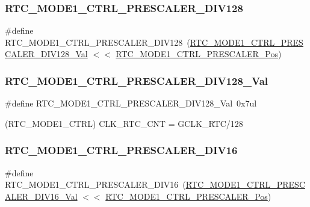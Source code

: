 \subsubsection{\texorpdfstring{RTC\_MODE1\_CTRL\_PRESCALER\_DIV128}{RTC\_MODE1\_CTRL\_PRESCALER\_DIV128}}
{\footnotesize\ttfamily \#define R\+T\+C\+\_\+\+M\+O\+D\+E1\+\_\+\+C\+T\+R\+L\+\_\+\+P\+R\+E\+S\+C\+A\+L\+E\+R\+\_\+\+D\+I\+V128~(\mbox{\hyperlink{group___s_a_m_d21___r_t_c_gaba4ba3df4dc79b5eba5ec7d8dab4ae5e}{R\+T\+C\+\_\+\+M\+O\+D\+E1\+\_\+\+C\+T\+R\+L\+\_\+\+P\+R\+E\+S\+C\+A\+L\+E\+R\+\_\+\+D\+I\+V128\+\_\+\+Val}} $<$$<$ \mbox{\hyperlink{group___s_a_m_d21___r_t_c_gad44b853d16e29aa5a84f3bb4087a6e1e}{R\+T\+C\+\_\+\+M\+O\+D\+E1\+\_\+\+C\+T\+R\+L\+\_\+\+P\+R\+E\+S\+C\+A\+L\+E\+R\+\_\+\+Pos}})}

\mbox{\label{group___s_a_m_d21___r_t_c_gaba4ba3df4dc79b5eba5ec7d8dab4ae5e}} 
\subsubsection{\texorpdfstring{RTC\_MODE1\_CTRL\_PRESCALER\_DIV128\_Val}{RTC\_MODE1\_CTRL\_PRESCALER\_DIV128\_Val}}
{\footnotesize\ttfamily \#define R\+T\+C\+\_\+\+M\+O\+D\+E1\+\_\+\+C\+T\+R\+L\+\_\+\+P\+R\+E\+S\+C\+A\+L\+E\+R\+\_\+\+D\+I\+V128\+\_\+\+Val~0x7ul}



(R\+T\+C\+\_\+\+M\+O\+D\+E1\+\_\+\+C\+T\+RL) C\+L\+K\+\_\+\+R\+T\+C\+\_\+\+C\+NT = G\+C\+L\+K\+\_\+\+R\+T\+C/128 

\mbox{\label{group___s_a_m_d21___r_t_c_ga9004736290d4bb3681f2b485c5d7545e}} 
\subsubsection{\texorpdfstring{RTC\_MODE1\_CTRL\_PRESCALER\_DIV16}{RTC\_MODE1\_CTRL\_PRESCALER\_DIV16}}
{\footnotesize\ttfamily \#define R\+T\+C\+\_\+\+M\+O\+D\+E1\+\_\+\+C\+T\+R\+L\+\_\+\+P\+R\+E\+S\+C\+A\+L\+E\+R\+\_\+\+D\+I\+V16~(\mbox{\hyperlink{group___s_a_m_d21___r_t_c_gae03a9107edd04d0825cce744ae99b393}{R\+T\+C\+\_\+\+M\+O\+D\+E1\+\_\+\+C\+T\+R\+L\+\_\+\+P\+R\+E\+S\+C\+A\+L\+E\+R\+\_\+\+D\+I\+V16\+\_\+\+Val}} $<$$<$ \mbox{\hyperlink{group___s_a_m_d21___r_t_c_gad44b853d16e29aa5a84f3bb4087a6e1e}{R\+T\+C\+\_\+\+M\+O\+D\+E1\+\_\+\+C\+T\+R\+L\+\_\+\+P\+R\+E\+S\+C\+A\+L\+E\+R\+\_\+\+Pos}})}


